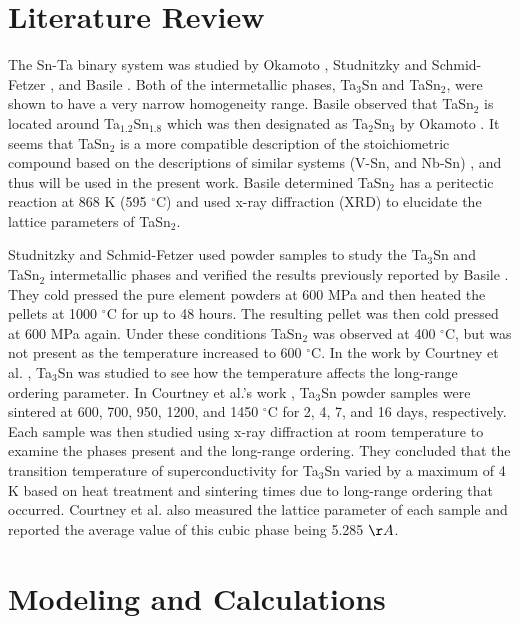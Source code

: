 \section{Literature Review}

The Sn-Ta binary system was studied by Okamoto \cite{Okamoto2003}, Studnitzky and Schmid-Fetzer \cite{Studnitzky2002}, and Basile \cite{Basile1971}. Both of the intermetallic phases, Ta$_{3}$Sn and TaSn$_{2}$, were shown to have a very narrow homogeneity range. Basile \cite{Basile1971} observed that TaSn$_{2}$ is located around Ta$_{1.2}$Sn$_{1.8}$ which was then designated as Ta$_2$Sn$_3$ by Okamoto \cite{Okamoto2003}. It seems that TaSn$_2$ is a more compatible description of the stoichiometric compound based on the descriptions of similar systems (V-Sn, and Nb-Sn) \cite{Yue2009,Toffolon1998,Toffolon2002}, and thus will be used in the present work. Basile \cite{Basile1971} determined TaSn$_2$ has a peritectic reaction at 868 K (595 $^{\circ}$C) and used x-ray diffraction (XRD) to elucidate the lattice parameters of TaSn$_2$.  

Studnitzky and Schmid-Fetzer \cite{Studnitzky2002} used powder samples to study the Ta$_3$Sn and TaSn$_2$ intermetallic phases and verified the results previously reported by Basile \cite{Basile1971}. They cold pressed the pure element powders at 600 MPa and then heated the pellets at 1000 $^{\circ}$C for up to 48 hours.  The resulting pellet was then cold pressed at 600 MPa again. Under these conditions TaSn$_2$ was observed at 400 $^{\circ}$C, but was not present as the temperature increased to 600 $^{\circ}$C.  In the work by Courtney et al. \cite{Courtney1965}, Ta$_3$Sn was studied to see how the temperature affects the long-range ordering parameter. In Courtney et al.'s work  \cite{Courtney1965}, Ta$_3$Sn powder samples were sintered at 600, 700, 950, 1200, and 1450 $^{\circ}$C for 2, 4, 7, and 16 days, respectively.  Each sample was then studied using x-ray diffraction at room temperature to examine the phases present and the long-range ordering. They concluded that the transition temperature of superconductivity for Ta$_3$Sn varied by a maximum of 4 K based on heat treatment and sintering times due to long-range ordering that occurred. Courtney et al.  \cite{Courtney1965} also measured the lattice parameter of each sample and reported the average value of this cubic phase being 5.285 $\AA$.


\section{Modeling and Calculations}

